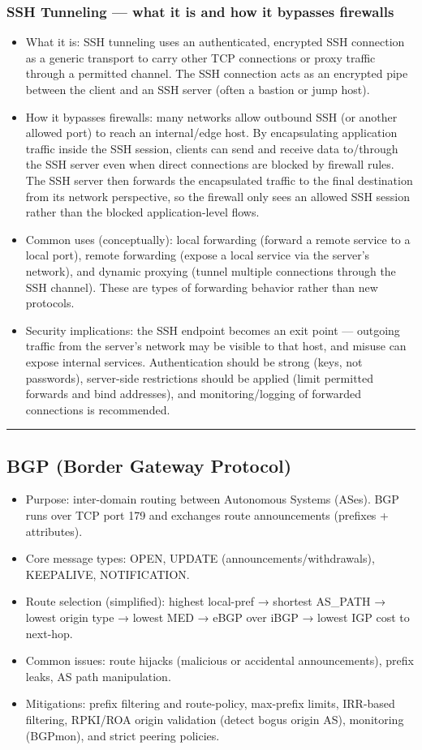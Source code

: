 \documentclass{article}
\begin{document}
\subsubsection{SSH Tunneling — what it is and how it bypasses firewalls}
\begin{itemize}
  \item What it is: SSH tunneling uses an authenticated, encrypted SSH connection as a generic transport to carry other TCP connections or proxy traffic through a permitted channel. The SSH connection acts as an encrypted pipe between the client and an SSH server (often a bastion or jump host).
  \item How it bypasses firewalls: many networks allow outbound SSH (or another allowed port) to reach an internal/edge host. By encapsulating application traffic inside the SSH session, clients can send and receive data to/through the SSH server even when direct connections are blocked by firewall rules. The SSH server then forwards the encapsulated traffic to the final destination from its network perspective, so the firewall only sees an allowed SSH session rather than the blocked application-level flows.
  \item Common uses (conceptually): local forwarding (forward a remote service to a local port), remote forwarding (expose a local service via the server's network), and dynamic proxying (tunnel multiple connections through the SSH channel). These are types of forwarding behavior rather than new protocols.
  \item Security implications: the SSH endpoint becomes an exit point — outgoing traffic from the server's network may be visible to that host, and misuse can expose internal services. Authentication should be strong (keys, not passwords), server-side restrictions should be applied (limit permitted forwards and bind addresses), and monitoring/logging of forwarded connections is recommended.
\end{itemize}

\hrule

\subsection{BGP (Border Gateway Protocol)}
\begin{itemize}
  \item Purpose: inter-domain routing between Autonomous Systems (ASes). BGP runs over TCP port 179 and exchanges route announcements (prefixes + attributes).
  \item Core message types: OPEN, UPDATE (announcements/withdrawals), KEEPALIVE, NOTIFICATION.
  \item Route selection (simplified): highest local-pref → shortest AS_PATH → lowest origin type → lowest MED → eBGP over iBGP → lowest IGP cost to next-hop.
  \item Common issues: route hijacks (malicious or accidental announcements), prefix leaks, AS path manipulation.
  \item Mitigations: prefix filtering and route-policy, max-prefix limits, IRR-based filtering, RPKI/ROA origin validation (detect bogus origin AS), monitoring (BGPmon), and strict peering policies.
\end{itemize}
\end{document}
